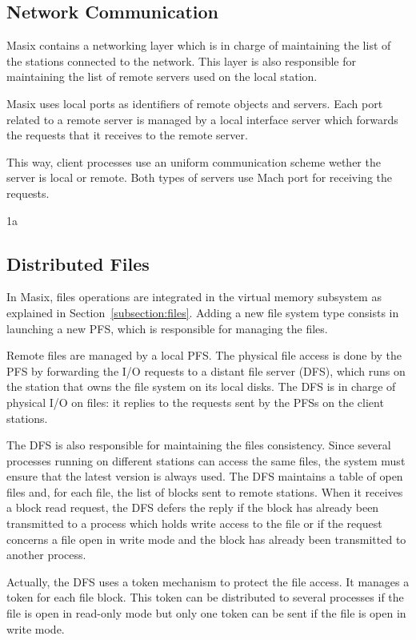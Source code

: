 \subsection {Network Communication}
\label {subsection:comm}

	Masix contains a networking layer which is in charge of maintaining
the list of the stations connected to the network. This layer is also
responsible for maintaining the list of remote servers used on the local
station.

	Masix uses local ports as identifiers of remote objects and servers.
Each port related to a remote server is managed by a local interface server
which forwards the requests that it receives to the remote server.

	This way, client processes use an uniform communication scheme
wether the server is local or remote. Both types of servers use Mach
port for receiving the requests.

 {1a}

\subsection {Distributed Files}

	In Masix, files operations are integrated in the virtual memory
subsystem as explained in Section~\ref {subsection:files}. Adding a new file
system type consists in launching a new PFS, which is responsible for
managing the files.

	Remote files are managed by a local PFS. The physical file access is
done by the PFS by forwarding the I/O requests to a distant file server (DFS),
which runs on the station that owns the file system on its local disks. The
DFS is in charge of physical I/O on files: it replies to the requests sent
by the PFSs on the client stations.

	The DFS is also responsible for maintaining the files consistency.
Since several processes running on different stations can access the same
files, the system must ensure that the latest version is always used. The DFS
maintains a table of open files and, for each file, the list of blocks sent
to remote stations. When it receives a block read request, the DFS defers
the reply if the block has already been transmitted to a process which holds
write access to the file or if the request concerns a file open in write mode
and the block has already been transmitted to another process.

	Actually, the DFS uses a token mechanism to protect the file access. It
manages a token for each file block. This token can be distributed to
several processes if the file is open in read-only mode but only one
token can be sent if the file is open in write mode.

